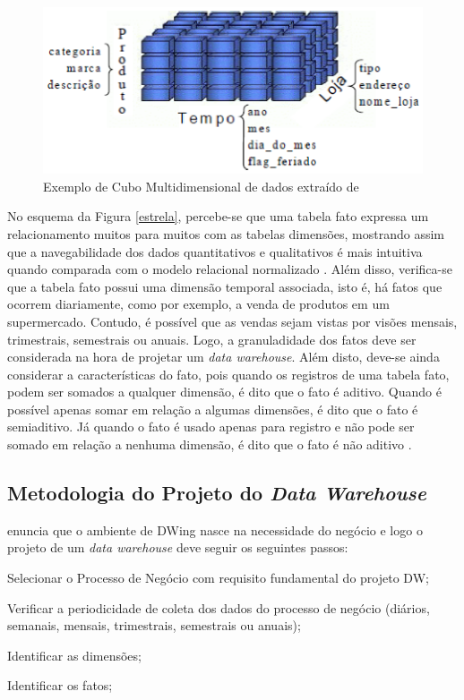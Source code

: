 \begin{figure}[h!]
\centering
\includegraphics[keepaspectratio=false,scale=0.85]{figuras/cube.eps}
\caption{Exemplo de Cubo Multidimensional de dados extraído de }
\label{cube}
\end{figure}
\FloatBarrier


No esquema da Figura \ref{estrela}, percebe-se que uma tabela fato expressa um relacionamento muitos para muitos com as tabelas dimensões, mostrando assim que a navegabilidade dos dados quantitativos e qualitativos é mais intuitiva quando comparada com o modelo relacional normalizado \cite{Kimball2002}. Além disso, verifica-se que a tabela fato possui uma dimensão temporal associada, isto é, há fatos que ocorrem diariamente, como por exemplo, a venda de produtos em um supermercado. Contudo, é possível que as vendas sejam vistas por visões mensais, trimestrais, semestrais ou anuais. Logo, a granuladidade dos fatos deve ser considerada na hora de projetar um \textit{data warehouse}. Além disto, deve-se ainda considerar a características do fato, pois quando os registros de uma tabela fato, podem ser somados a qualquer dimensão, é dito que o fato é aditivo. Quando é possível apenas somar em relação a algumas dimensões, é dito que o fato é semiaditivo. Já quando o fato é usado apenas para registro e não pode ser somado em relação a nenhuma dimensão, é dito que o fato é não aditivo \cite{Inmon1992}.

\subsection{Metodologia do Projeto do \textit{Data Warehouse}}
\label{metodologia-dw}
 enuncia que o ambiente de DWing nasce na necessidade do negócio e logo o projeto de um \textit{data warehouse} deve seguir os seguintes passos: 

\begin{inparaenum}[1)]
	\item Selecionar o Processo de Negócio com requisito fundamental do 
	projeto DW;
	
	\item Verificar a periodicidade de coleta dos dados do processo de negócio (diários, semanais, mensais, trimestrais, semestrais ou anuais);
	
	\item Identificar as dimensões;
	
	\item Identificar os fatos;

\end{inparaenum} 


